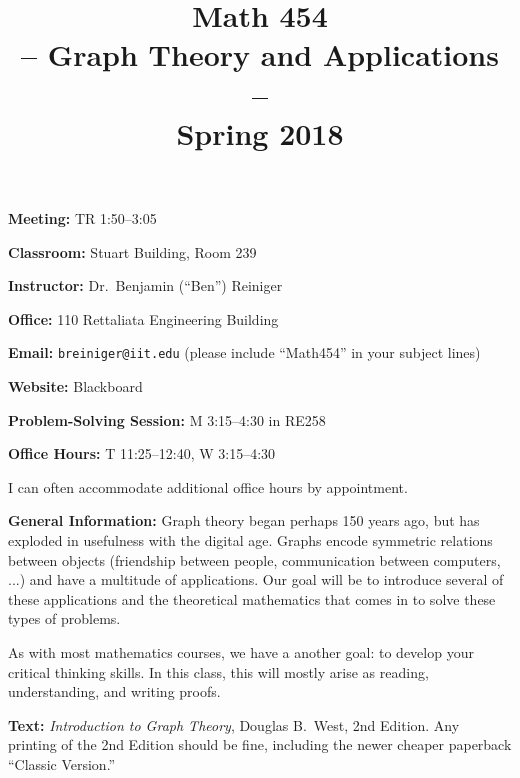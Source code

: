 \documentclass[11pt]{amsart}
\begin{document}
\title{Math 454 \\-- Graph Theory and Applications --\\Spring 2018}
\maketitle
\thispagestyle{empty}

\noindent\textbf{Meeting:}  TR 1:50--3:05

\textbf{Classroom:}  Stuart Building, Room 239

\noindent\textbf{Instructor:}  Dr.~Benjamin (``Ben'') Reiniger

\textbf{Office:}  110 Rettaliata Engineering Building

\textbf{Email:}  \texttt{breiniger{@}iit.edu} \qquad (please include ``Math454'' in your subject lines)

\noindent\textbf{Website:}  Blackboard%


\noindent\textbf{Problem-Solving Session:}  M 3:15--4:30 in RE258

\noindent\textbf{Office Hours:}  T 11:25--12:40,  W 3:15--4:30

I can often accommodate additional office hours by appointment.

\raggedright

\vspace{10pt}

\noindent \textbf{General Information:}  Graph theory began perhaps 150 years ago, but has exploded in usefulness with the digital age.  Graphs encode symmetric relations between objects (friendship between people, communication between computers, ...) and have a multitude of applications.  Our goal will be to introduce several of these applications and the theoretical mathematics that comes in to solve these types of problems.%

As with most mathematics courses, we have a another goal: to develop your critical thinking skills.  In this class, this will mostly arise as reading, understanding, and writing proofs.

\vspace{10pt}
\noindent \textbf{Text:}   \textit{Introduction to Graph Theory}, Douglas B.~West, 2nd Edition.  Any printing of the 2nd Edition should be fine, including the newer cheaper paperback ``Classic Version.''%
\end{document}
